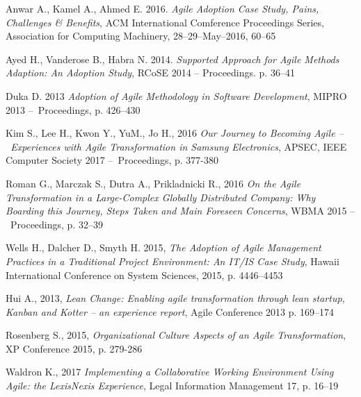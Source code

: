 \noindent [P1] Anwar A., Kamel A., Ahmed E. 2016. \textit{Agile Adoption Case Study, Pains, Challenges \& Benefits}, ACM International Comference Proceedings Series, Association for Computing Machinery, 28–29–May–2016, 60–65

\noindent [P2] Ayed H., Vanderose B., Habra N. 2014. \textit{Supported Approach for Agile Methods Adaption: An Adoption Study}, RCoSE 2014 – Proceedings. p. 36–41

\noindent [P3] Duka D. 2013 \textit{Adoption of Agile Methodology in Software Development}, MIPRO 2013 – Proceedings, p. 426–430

\noindent [P4] Kim S., Lee H., Kwon Y., YuM., Jo H., 2016 \textit{Our Journey to Becoming Agile – Experiences with Agile Transformation in Samsung Electronics}, APSEC, IEEE Computer Society 2017 – Proceedings, p. 377-380

\noindent [P5] Roman G., Marczak S., Dutra A., Prikladnicki R., 2016 \textit{On the Agile Transformation in a Large-Complex Globally Distributed Company: Why Boarding this Journey, Steps Taken and Main Foreseen Concerns}, WBMA 2015 – Proceedings, p. 32–39

\noindent [P6] Wells H., Dalcher D., Smyth H. 2015, \textit{The Adoption of Agile Management Practices in a Traditional Project Environment: An IT/IS Case Study}, Hawaii International Conference on System Sciences, 2015, p. 4446–4453

\noindent [P7] Hui A., 2013, \textit{Lean Change: Enabling agile transformation through lean startup, Kanban and Kotter – an experience report}, Agile Conference 2013 p. 169–174

\noindent [P8] Rosenberg S., 2015, \textit{Organizational Culture Aspects of an Agile Transformation}, XP Conference 2015, p. 279-286

\noindent [P9] Waldron K., 2017 \textit{Implementing a Collaborative Working Environment Using Agile: the LexisNexis Experience}, Legal Information Management 17, p. 16–19
